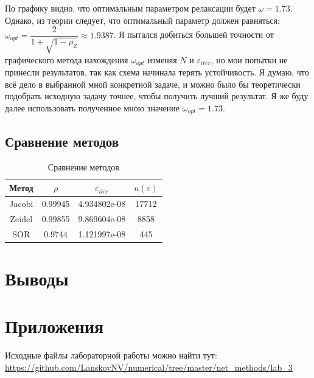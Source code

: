 \documentclass[12pt]{article}
\begin{document}
По графику видно, что оптимальным параметром релаксации будет $\omega = 1.73$. Однако, из теории следует, что оптимальный параметр должен равняться: $\omega_{opt} = \dfrac{2}{1+\sqrt{1 - \rho_{Z}}} \approx 1.9387$. Я пытался добиться большей точности от графического метода нахождения $\omega_{opt}$ изменяя $N$ и $\varepsilon_{iter}$, но мои попытки не принесли результатов, так как схема начинала терять устойчивость. Я думаю, что всё дело в выбранной мной конкретной задаче, и можно было бы теоретически подобрать исходную задачу точнее, чтобы получить лучший результат. Я же буду далее использовать полученное мною значение $\omega_{opt} = 1.73$.

\subsection{Сравнение методов}

\begin{table}[H]
\caption{Сравнение методов}
\begin{center}
\begin{tabular}{|c|c|c|c|}
\hline
Метод & $\rho$ & $\varepsilon_{iter}$ & $n(\varepsilon)$ \\
\hline
Jacobi & 0.99945 & 4.934802e-08 & 17712 \\
\hline
Zeidel & 0.99855 & 9.869604e-08 & 8858 \\
\hline
SOR & 0.9744 & 1.121997e-08 & 445 \\
\hline
\end{tabular}
\end{center}
\end{table}


\section{Выводы}
\section{Приложения}
Исходные файлы лабораторной работы можно найти тут: \\
\url{https://github.com/LanskovNV/numerical/tree/master/net_methods/lab_3}
\end{document}
